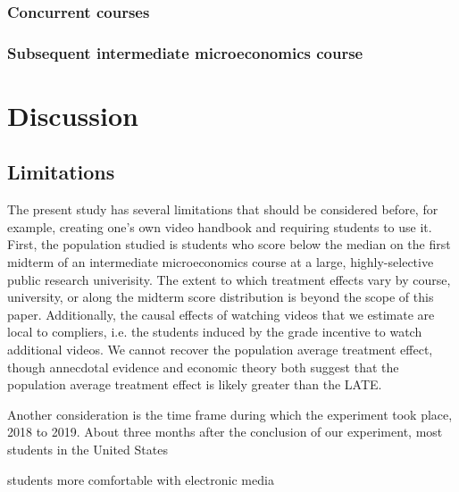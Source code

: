 \documentclass[12pt]{article}
\begin{document}
\subsubsection{Concurrent courses}

\subsubsection{Subsequent intermediate microeconomics course}




\section{Discussion} \label{discussion}

\subsection{Limitations}

The present study has several limitations that should be considered before, for example, creating one's own video handbook and requiring students to use it. First, the population studied is students who score below the median on the first midterm of an intermediate microeconomics course at a large, highly-selective public research univerisity. The extent to which treatment effects vary by course, university, or along the midterm score distribution is beyond the scope of this paper. Additionally, the causal effects of watching videos that we estimate are local to compliers, i.e. the students induced by the grade incentive to watch additional videos. We cannot recover the population average treatment effect, though annecdotal evidence and economic theory both suggest that the population average treatment effect is likely greater than the LATE.

Another consideration is the time frame during which the experiment took place, 2018 to 2019. About three months after the conclusion of our experiment, most students in the United States

students more comfortable with electronic media

\end{document}
